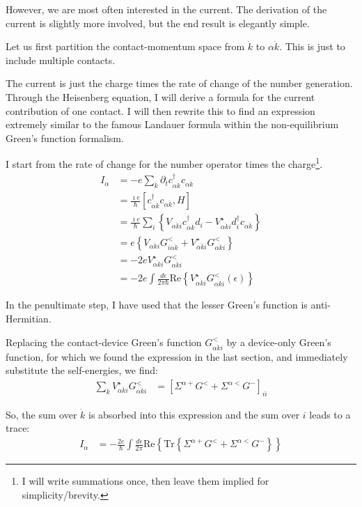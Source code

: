 However, we are most often interested in the current. The derivation of the current is slightly more involved, but the end result is elegantly simple.

Let us first partition the contact-momentum space from $\dot{k}$ to $\alpha\dot{k}$. This is just to include multiple contacts.

The current is just the charge times the rate of change of the number generation. Through the Heisenberg equation, I will derive a formula for the current contribution of one contact. I will then rewrite this to find an expression extremely similar to the famous Landauer formula within the non-equilibrium Green's function formalism.

I start from the rate of change for the number operator times the charge\footnote{I will write summations once, then leave them implied for simplicity/brevity.}.  
\begin{align*}
I_\alpha &= - e \sum_{\dot{k}} \partial_t c^\dagger_{\alpha\dot{k}} c_{\alpha\dot{k}} \\
&= \frac{\imath e}{\hbar} \left[ c^\dagger_{\alpha\dot{k}} c_{\alpha\dot{k}}, H\right] \\
&= \frac{\imath e}{\hbar}\sum_i \left\{ V_{\alpha\dot{k}i} c^\dagger_{\alpha\dot{k}} d_i - V^\star_{\alpha\dot{k}i} d_i^\dagger c_{\alpha\dot{k}}\right\} \\
&= e \left\{ V_{\alpha\dot{k}i} G^<_{i\alpha\dot{k}} + V_{\alpha\dot{k}i}^\star G^<_{\alpha\dot{k}i}\right\}\\
&= -2e V^\star_{\alpha\dot{k}i}G^<_{\alpha\dot{k}i} \\
&= -2e \int \frac{d\epsilon}{2\pi\hbar} \text{Re}\left\{ V^\star_{\alpha\dot{k}i} G^<_{\alpha\dot{k}i} (\epsilon) \right\}
\end{align*}

In the penultimate step, I have used that the lesser Green's function is anti-Hermitian. 

Replacing the contact-device Green's function $G^<_{\alpha\dot{k}i}$ by a device-only Green's function, for which we found the expression in the last section, and immediately substitute the self-energies, we find:
\begin{align*}
\sum_{\dot{k}} V^\star_{\alpha\dot{k}i} G^<_{\alpha\dot{k}i} &= \left[\Sigma^{\alpha+} G^< + \Sigma^{\alpha <} G^-\right]_{ii}
\end{align*}

So, the sum over $\dot{k}$ is absorbed into this expression and the sum over $i$ leads to a trace:
\begin{align*}
I_\alpha &= -\frac{2e}{\hbar} \int \frac{d\epsilon}{2\pi} \text{Re} \left\{ \text{Tr} \left \{ \Sigma^{\alpha+} G^< + \Sigma^{\alpha <} G^-\right\}\right\}
\end{align*}

